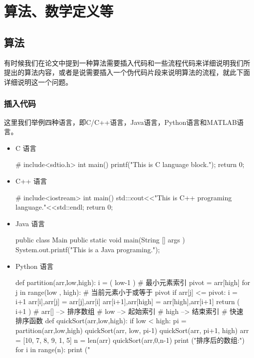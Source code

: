 \chapter{算法、数学定义等}
\section{算法}

有时候我们在论文中提到一种算法需要插入代码和一些流程代码来详细说明我们所提出的算法内容，或者是说需要插入一个伪代码片段来说明算法的流程，就此下面详细说明这一个问题。
\subsection{插入代码}
这里我们举例四种语言，即C/C++语言，Java语言，Python语言和MATLAB语言。

\begin{itemize}
    \item C 语言
\begin{CLanguage}
# include<sdtio.h>
int main(){
    printf("This is C language block.");
    return 0;
}
\end{CLanguage}
\item C++ 语言
\begin{CPlusPlus}
# include<iostream>
int main(){
    std:::cout<<"This is C++ programing language."<<std::endl;
    return 0;
}
\end{CPlusPlus}
    \item Java 语言
\begin{Java}
public class Main{
    public static void main(String [] args ){
        System.out.printf("This is a Java programing.");
    }
}
\end{Java}
    \item Python 语言
\begin{Python}
def partition(arr,low,high): 
    i = ( low-1 )         # 最小元素索引
    pivot = arr[high]     
    for j in range(low , high): 
        # 当前元素小于或等于 pivot 
        if   arr[j] <= pivot: 
            i = i+1 
            arr[i],arr[j] = arr[j],arr[i] 
    arr[i+1],arr[high] = arr[high],arr[i+1] 
    return ( i+1 ) 
# arr[] --> 排序数组
# low  --> 起始索引
# high  --> 结束索引
# 快速排序函数
def quickSort(arr,low,high): 
    if low < high: 
        pi = partition(arr,low,high) 
        quickSort(arr, low, pi-1) 
        quickSort(arr, pi+1, high) 
arr = [10, 7, 8, 9, 1, 5] 
n = len(arr) 
quickSort(arr,0,n-1) 
print ("排序后的数组:") 
for i in range(n): 
    print ("%
\end{Python}  

\end{itemize}
